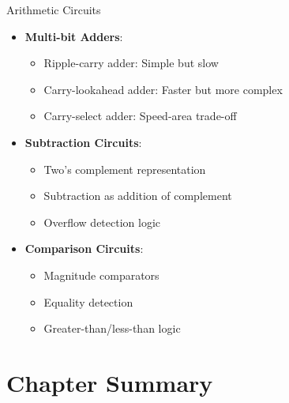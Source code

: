 \documentclass[aspectratio=169,11pt]{beamer}
\newcommand{\concept}[1]{\textbf{\color{accentcolor}#1}}
\begin{document}
\begin{frame}{Arithmetic Circuits}
\begin{itemize}
\item \concept{Multi-bit Adders}:
\begin{itemize}
\item Ripple-carry adder: Simple but slow
\item Carry-lookahead adder: Faster but more complex
\item Carry-select adder: Speed-area trade-off
\end{itemize}
\vspace{0.5cm}
\item \concept{Subtraction Circuits}:
\begin{itemize}
\item Two's complement representation
\item Subtraction as addition of complement
\item Overflow detection logic
\end{itemize}
\vspace{0.5cm}
\item \concept{Comparison Circuits}:
\begin{itemize}
\item Magnitude comparators
\item Equality detection
\item Greater-than/less-than logic
\end{itemize}
\end{itemize}
\end{frame}

\section{Chapter Summary}
\end{document}
